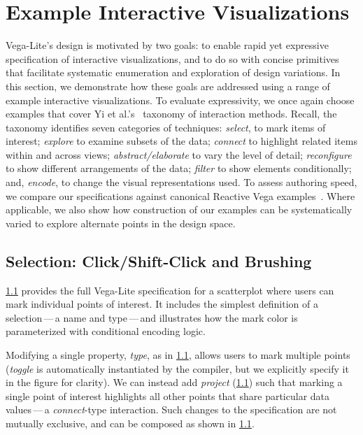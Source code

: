 \section{Example Interactive Visualizations}
\label{sec:vl:examples}

Vega-Lite's design is motivated by two goals: to enable rapid yet expressive
specification of interactive visualizations, and to do so with concise
primitives that facilitate systematic enumeration and exploration of design
variations. In this section, we demonstrate how these goals are addressed using
a range of example interactive visualizations. To evaluate expressivity, we once
again choose examples that cover Yi et al.'s~\cite{yi:understanding} taxonomy of
interaction methods. Recall, the taxonomy identifies seven categories of
techniques: \emph{select}, to mark items of interest; \emph{explore} to examine
subsets of the data; \emph{connect} to highlight related items within and across
views; \emph{abstract/elaborate} to vary the level of detail; \emph{reconfigure}
to show different arrangements of the data; \emph{filter} to show elements
conditionally; and, \emph{encode}, to change the visual representations used. To
assess authoring speed, we compare our specifications against canonical Reactive
Vega examples~\cite{reactive-vega-arch, reactive-vega-model, vega:editor}. Where
applicable, we also show how construction of our examples can be systematically
varied to explore alternate points in the design space.

\subsection{Selection: Click/Shift-Click and Brushing}

\cref{} provides the full Vega-Lite specification for a
scatterplot where users can mark individual points of interest. It includes the
simplest definition of a selection\,---\,a name and type\,---\,and illustrates
how the mark color is parameterized with conditional encoding logic.

Modifying a single property, \emph{type}, as in
\cref{}, allows users to mark multiple points
(\emph{toggle} is automatically instantiated by the compiler, but we explicitly
specify it in the figure for clarity). We can instead add \emph{project}
(\cref{}) such that marking a single point of interest
highlights all other points that share particular data values\,---\,a
\emph{connect}-type interaction. Such changes to the specification are not
mutually exclusive, and can be composed as shown in
\cref{}.


